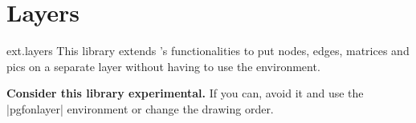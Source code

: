 %
%
%

\section{Layers}
\begin{tikzlibrary}{ext.layers}
This library extends \tikzname's functionalities to put nodes, edges, matrices and pics
on a separate layer without having to use the  environment.

\textbf{Consider this library experimental.}
If you can, avoid it and use the |pgfonlayer| environment
or change the drawing order.
\end{tikzlibrary}

